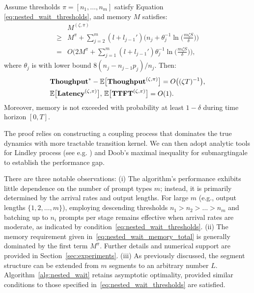 \begin{theorem}
\label{thm:nested_wait_heavy_traffic}
Assume thresholds \( \pi = [n_1, \dots, n_m] \) satisfy Equation \eqref{eq:nested_wait_thresholds}, and memory \( M \) satisfies:
\begin{equation}
    \label{eq:nested_wait_memory_total}
\begin{aligned}
    &M^{(\zeta,\pi)}\\
\geq &M^\pi + \sum_{j=2}^m (l + l_{j-1}') \bigg(n_j + \theta_j^{-1} \ln\Big( \frac{m \zeta S}{\delta} \Big)\bigg) \\
=& O\bigg( 2M^\pi + \sum_{j=1}^m (l + l_{j-1}') \theta_j^{-1}\ln\Big( \frac{m \zeta S}{\delta} \Big) \bigg),
\end{aligned}
\end{equation}
where \( \theta_j \) is with lower bound $8(n_j-n_{j-1}p_j)/n_j.$ Then:
$$
    \begin{aligned}
        &\textbf{Thoughput}^* - \mathbb{E}\big[ \textbf{Thoughput}^{(\zeta, \pi)} \big] 
   = O\big( (\zeta T)^{-1} \big), \\
&\mathbb{E}\big[ \textbf{Latency}^{(\zeta, \pi)} \big],\,\mathbb{E}\big[ \textbf{TTFT}^{(\zeta, \pi)} \big] = O(1).
    \end{aligned}
$$
Moreover, memory is not exceeded with probability at least \( 1 - \delta \) during time horizon $[0,T].$
\end{theorem}

The proof relies on constructing a coupling process that dominates the true dynamics with more tractable transition kernel. We can then adopt analytic tools for Lindley process (see e.g. \cite{hill1982comparisons}) and Doob's maximal inequality for submargtingale to establish the performance gap. 

There are three notable observations: (i) The algorithm's performance exhibits little dependence on the number of prompt types \( m \); instead, it is primarily determined by the arrival rates and output lengths. For large \( m \) (e.g., output lengths \( \{1, 2, \dots, m\} \)), employing descending thresholds \( n_1 > n_2 > \dots > n_m \) and batching up to \( n_i \) prompts per stage remains effective when arrival rates are moderate, as indicated by condition~\eqref{eq:nested_wait_thresholds}. (ii) The memory requirement given in~\eqref{eq:nested_wait_memory_total} is generally dominated by the first term \( M^\pi \). Further details and numerical support are provided in Section~\ref{sec:experiments}. (iii) As previously discussed, the segment structure can be extended from \( m \) segments to an arbitrary number \( L \). Algorithm~\ref{alg:nested_wait} retains asymptotic optimality, provided similar conditions to those specified in~\eqref{eq:nested_wait_thresholds} are satisfied. 

